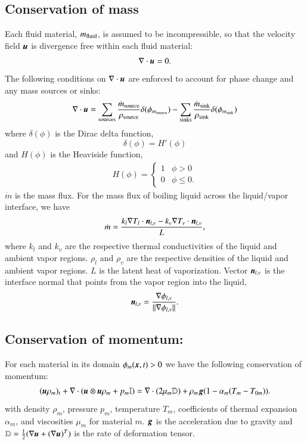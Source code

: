 \documentclass[preprint,12pt]{Definitions/elsarticle}
\newcommand{\tn}{\textnormal}
\newcommand{\bmg}{\mbox{\boldmath $g$\unboldmath}}
\newcommand{\bmu}{\mbox{\boldmath $u$\unboldmath}}
\newcommand{\bmx}{\mbox{\boldmath $x$\unboldmath}}
\newcommand{\bmn}{\mbox{\boldmath $n$\unboldmath}}
\newcommand{\DefTen}{\mathbb{D}}
\newcommand{\EyeTen}{\mathbb{I}}
\begin{document}
\subsection{Conservation of mass}
\noindent Each fluid material, $m_\tn{fluid}$, is assumed to be incompressible, 
so that the velocity field $\bmu$ is divergence free within each fluid material:
\begin{equation}
\label{eq:cnt}
\nabla \cdot \bmu = 0.
\end{equation}
The following conditions on $\nabla \cdot \bmu$ are enforced to account for phase change and any mass sources or sinks:
\begin{equation}
\nabla \cdot \bmu = 
\sum_{\tn{sources}} 
\frac{\dot{m}_{\tn{source}}}
{\rho_{\tn{source}}}\delta(\phi_{m_{\tn{source}}}) -
\sum_{\tn{sinks}} 
\frac{\dot{m}_{\tn{sink}}}
{\rho_{\tn{sink}}}\delta(\phi_{m_{\tn{sink}}}) 
\label{eq:divu}
\end{equation}
\noindent where $\delta(\phi)$ is the Dirac delta function,
\begin{equation}
\delta(\phi)=H'(\phi)
\end{equation}
\noindent and $H(\phi)$ is the Heaviside function,
\begin{align}
H(\phi)=\left\{ \begin{array}{cc}
1 & \phi>0  \\
0 & \phi\le 0. \end{array} 
\right.
\end{align}
\noindent $\dot{m}$ is the mass flux. For the mass flux of boiling 
liquid across the liquid/vapor interface, we have
\begin{equation}
\dot{m} = 
\frac{k_{l}\nabla T_{l}\cdot \bmn_{l,v} - 
	k_{v}\nabla T_{v}\cdot \bmn_{l,v}}{L},
\label{eq:massflux}
\end{equation}
where
$k_{l}$ and $k_{v}$ are the respective thermal conductivities of the 
liquid and ambient vapor regions. $\rho_{l}$ and
$\rho_{v}$ are the respective densities of the liquid and ambient vapor
regions. $L$ is the latent heat of vaporization. Vector $\bmn_{l,v}$ is the interface normal that points from the vapor region into the liquid,
\begin{equation}
\bmn_{l,v} = \frac{\nabla\phi_{l,v}}{||\nabla\phi_{l,v}||}.
\end{equation}


\subsection{Conservation of momentum:}
\noindent For each material in its domain $\phi_{m}(\bmx,t)>0$ we have the following conservation of momentum:
\begin{align}
(\bmu\rho_{m})_{t}+
\nabla\cdot(\bmu \otimes \bmu \rho_{m}+p_{m} \EyeTen)=
\nabla\cdot(2\mu_{m}\DefTen)+
\rho_{m}\bmg (1-\alpha_{m}(T_{m}-T_{0m})).
\label{eq:NS}
\end{align}
with density $\rho_{m}$, pressure $p_{m}$, temperature $T_{m}$, coefficients of thermal expansion $\alpha_{m}$, and viscosities $\mu_{m}$ for material $m$. $\bmg$ is the acceleration due to gravity and $\DefTen= \frac{1}{2}(\nabla\bmu+(\nabla\bmu)^{T})$ is the rate of deformation tensor. 
\end{document}
